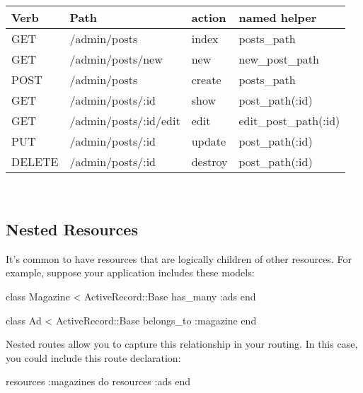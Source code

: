 \documentclass[10pt]{book}
\newenvironment{code}{%
  \scriptsize
    \verbatim
}{%
    \endverbatim
    \newline
}
\begin{document}
\noindent
\begin{tabular}{l|p{}|l|p{}}
\hline
\textbf{Verb} & \textbf{Path} & \textbf{action } & \textbf{named helper} \\ 
\hline
GET & /admin/posts          & index     &  posts\_path          \\ 
GET & /admin/posts/new      & new       &  new\_post\_path       \\ 
POST & /admin/posts          & create    &  posts\_path          \\ 
GET & /admin/posts/:id      & show      &  post\_path(:id)      \\ 
GET & /admin/posts/:id/edit & edit      &  edit\_post\_path(:id) \\ 
PUT & /admin/posts/:id      & update    &  post\_path(:id)      \\ 
DELETE & /admin/posts/:id      & destroy   &  post\_path(:id)     
\end{tabular}\\


\subsection{ Nested Resources}

It’s common to have resources that are logically children of other  resources. For example, suppose your application includes these models:
\begin{code}
class Magazine < ActiveRecord::Base
  has_many :ads
end
 
class Ad < ActiveRecord::Base
  belongs_to :magazine
end
\end{code}

Nested routes allow you to capture this relationship in your routing. In this case, you could include this route declaration:
\begin{code}
resources :magazines do
  resources :ads
end
\end{code}
\end{document}

